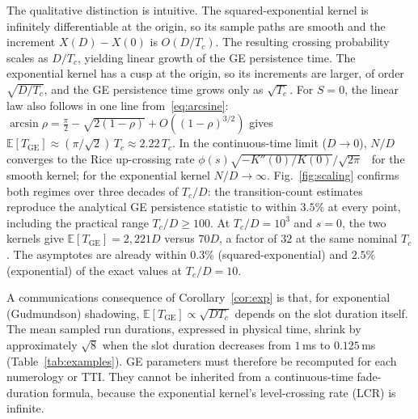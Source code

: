 \documentclass[conference]{IEEEtran}
\newcommand{\ETGE}{\mathbb{E}[T_{\mathrm{GE}}]}
\begin{document}
The qualitative distinction is intuitive. The squared-exponential kernel is infinitely differentiable at the origin, so its sample paths are smooth and the increment $X(D)-X(0)$ is $O(D/T_c)$. The resulting crossing probability scales as $D/T_c$, yielding linear growth of the GE persistence time. The exponential kernel has a cusp at the origin, so its increments are larger, of order $\sqrt{D/T_c}$, and the GE persistence time grows only as $\sqrt{T_c}$. For $S=0$, the linear law also follows in one line from~\eqref{eq:arcsine}: $\arcsin\rho=\frac\pi2-\sqrt{2(1-\rho)}+O((1-\rho)^{3/2})$ gives $\ETGE\approx(\pi/\sqrt2)\,T_c\approx2.22\,T_c$. In the continuous-time limit ($D\to0$), $N/D$ converges to the Rice up-crossing rate $\phi(s)\sqrt{-K''(0)/K(0)}/\sqrt{2\pi}$~\cite[Sec.~3.3]{rice1945} for the smooth kernel; for the exponential kernel $N/D\to\infty$. Fig.~\ref{fig:scaling} confirms both regimes over three decades of $T_c/D$: the transition-count estimates reproduce the analytical GE persistence statistic to within $3.5\%$ at every point, including the practical range $T_c/D\ge100$. At $T_c/D=10^3$ and $s=0$, the two kernels give $\ETGE=2{,}221D$ versus $70D$, a factor of $32$ at the same nominal $T_c$. The asymptotes are already within $0.3\%$ (squared-exponential) and $2.5\%$ (exponential) of the exact values at $T_c/D=10$.

A communications consequence of Corollary~\ref{cor:exp} is that, for exponential (Gudmundson) shadowing, $\ETGE\propto\sqrt{DT_c}$ depends on the slot duration itself. The mean sampled run durations, expressed in physical time, shrink by approximately $\sqrt{8}$ when the slot duration decreases from $1$\,ms to $0.125$\,ms (Table~\ref{tab:examples}). GE parameters must therefore be recomputed for each numerology or TTI. They cannot be inherited from a continuous-time fade-duration formula, because the exponential kernel's level-crossing rate (LCR) is infinite.
\end{document}
